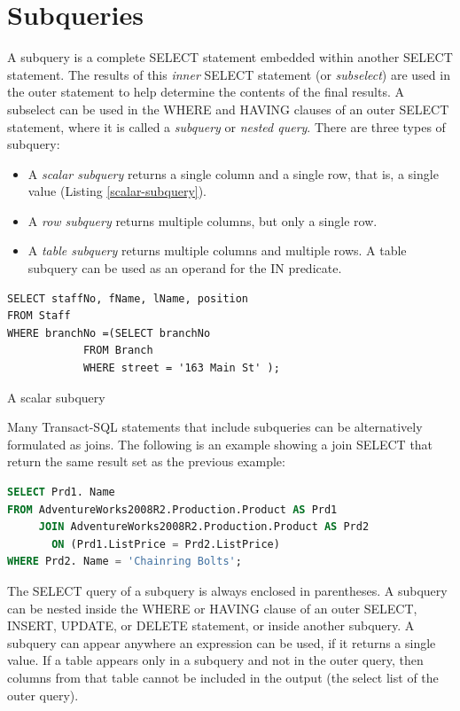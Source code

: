 \documentclass[12pt,a4paper]{article}
\begin{document}
\section{Subqueries}
A subquery is a complete SELECT statement embedded within another SELECT statement. The results of this \emph{inner} SELECT statement  (or \emph{subselect}) are used in the outer statement to help determine the contents of the final results. A subselect can be used in the WHERE and HAVING clauses of an outer SELECT statement, where it is called a \emph{subquery} or \emph{nested query}. There are three types of subquery:
\begin{itemize}
\item A \emph{scalar subquery} returns a single column and a single row, that is, a single value (Listing \ref{scalar-subquery}).
\item A \emph{row subquery} returns multiple columns, but only a single row.
\item A \emph{table subquery} returns multiple columns and multiple rows. A table subquery can be used as an operand for the IN predicate.
\end{itemize}
\begin{listing}
\begin{verbatim}
SELECT staffNo, fName, lName, position
FROM Staff
WHERE branchNo =(SELECT branchNo
     		FROM Branch
     		WHERE street = '163 Main St' );
\end{verbatim}
\caption{A scalar subquery}\label{scalar-subquery}
\end{listing}
Many Transact-SQL statements that include subqueries can be alternatively formulated as joins. The following is an example showing a join SELECT that return the same result set as the previous example:
\begin{lstlisting}[language=SQL,style=cool]
SELECT Prd1. Name
FROM AdventureWorks2008R2.Production.Product AS Prd1
     JOIN AdventureWorks2008R2.Production.Product AS Prd2
       ON (Prd1.ListPrice = Prd2.ListPrice)
WHERE Prd2. Name = 'Chainring Bolts';
\end{lstlisting}
The SELECT query of a subquery is always enclosed in parentheses. A subquery can be nested inside the WHERE or HAVING clause of an outer SELECT, INSERT, UPDATE, or DELETE statement, or inside another subquery. A subquery can appear anywhere an expression can be used, if it returns a single value. If a table appears only in a subquery and not in the outer query, then columns from that table cannot be included in the output (the select list of the outer query).
\end{document}
